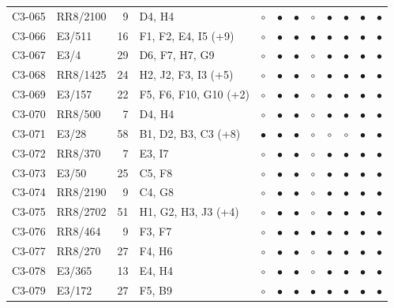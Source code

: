 {\begin{longtable}{llrp{3.9cm}cccccccc}
    C3-065 & RR8/2100 & 9 & D4, H4 & $\circ$ & $\bullet$ & $\bullet$ & $\circ$ & $\bullet$ & $\bullet$ & $\bullet$ & $\bullet$ \\
    C3-066 & E3/511 & 16 & F1, F2, E4, I5 (+9) & $\circ$ & $\bullet$ & $\bullet$ & $\bullet$ & $\bullet$ & $\bullet$ & $\bullet$ & $\bullet$ \\
    C3-067 & E3/4 & 29 & D6, F7, H7, G9 & $\circ$ & $\bullet$ & $\bullet$ & $\circ$ & $\bullet$ & $\bullet$ & $\bullet$ & $\bullet$ \\
    C3-068 & RR8/1425 & 24 & H2, J2, F3, I3 (+5) & $\circ$ & $\bullet$ & $\bullet$ & $\circ$ & $\bullet$ & $\bullet$ & $\bullet$ & $\bullet$ \\
    C3-069 & E3/157 & 22 & F5, F6, F10, G10 (+2) & $\circ$ & $\bullet$ & $\bullet$ & $\circ$ & $\bullet$ & $\bullet$ & $\bullet$ & $\bullet$ \\
    C3-070 & RR8/500 & 7 & D4, H4 & $\circ$ & $\bullet$ & $\bullet$ & $\circ$ & $\bullet$ & $\bullet$ & $\bullet$ & $\bullet$ \\
    C3-071 & E3/28 & 58 & B1, D2, B3, C3 (+8) & $\bullet$ & $\bullet$ & $\bullet$ & $\circ$ & $\circ$ & $\circ$ & $\bullet$ & $\bullet$ \\
    C3-072 & RR8/370 & 7 & E3, I7 & $\circ$ & $\bullet$ & $\bullet$ & $\circ$ & $\bullet$ & $\bullet$ & $\bullet$ & $\bullet$ \\
    C3-073 & E3/50 & 25 & C5, F8 & $\circ$ & $\bullet$ & $\bullet$ & $\circ$ & $\bullet$ & $\bullet$ & $\bullet$ & $\bullet$ \\
    C3-074 & RR8/2190 & 9 & C4, G8 & $\circ$ & $\bullet$ & $\bullet$ & $\circ$ & $\bullet$ & $\bullet$ & $\bullet$ & $\bullet$ \\
    C3-075 & RR8/2702 & 51 & H1, G2, H3, J3 (+4) & $\circ$ & $\bullet$ & $\bullet$ & $\circ$ & $\bullet$ & $\bullet$ & $\bullet$ & $\bullet$ \\
    C3-076 & RR8/464 & 9 & F3, F7 & $\circ$ & $\bullet$ & $\bullet$ & $\bullet$ & $\bullet$ & $\bullet$ & $\bullet$ & $\bullet$ \\
    C3-077 & RR8/270 & 27 & F4, H6 & $\circ$ & $\bullet$ & $\bullet$ & $\circ$ & $\bullet$ & $\bullet$ & $\bullet$ & $\bullet$ \\
    C3-078 & E3/365 & 13 & E4, H4 & $\circ$ & $\bullet$ & $\bullet$ & $\circ$ & $\bullet$ & $\bullet$ & $\bullet$ & $\bullet$ \\
    C3-079 & E3/172 & 27 & F5, B9 & $\circ$ & $\bullet$ & $\bullet$ & $\bullet$ & $\bullet$ & $\bullet$ & $\bullet$ & $\bullet$ \\

\end{longtable}}
